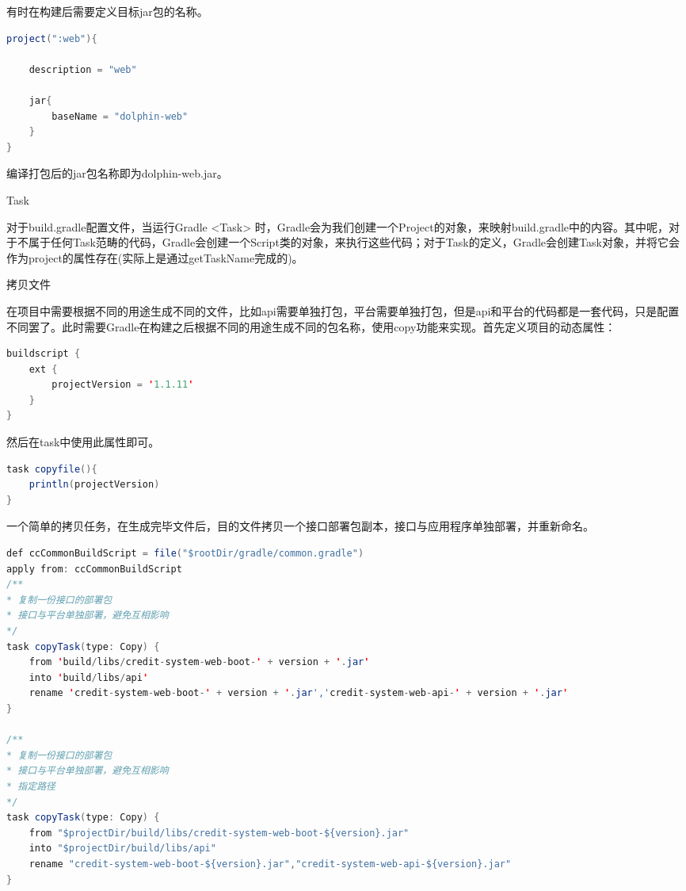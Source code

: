 \documentclass[12pt]{book}
\makeatletter
\numberwithin{dummy}{section}
\theoremstyle{ocrenumbox}
\theoremstyle{blacknumex}
\theoremstyle{blacknumbox}
\theoremstyle{ocrenum}
\renewcommand{\subsection}{\@startsection {subsection}{2}{\z@}
	{-3ex \@plus -0.1ex \@minus -.4ex}
	{0.5ex \@plus.2ex }
	{\normalfont\sffamily\bfseries}}
\renewcommand\paragraph{\@startsection{paragraph}{4}{\z@}
	{-2ex \@plus-.2ex \@minus .2ex}
	{.1ex}
	{\normalfont\small\sffamily\bfseries}}
\makeatother
\begin{document}
有时在构建后需要定义目标jar包的名称。

\begin{lstlisting}[language=Java]
project(":web"){

	description = "web"
	
	jar{
		baseName = "dolphin-web"
	}
}
\end{lstlisting}

编译打包后的jar包名称即为dolphin-web.jar。

\subsection{Task}

对于build.gradle配置文件，当运行Gradle <Task> 时，Gradle会为我们创建一个Project的对象，来映射build.gradle中的内容。其中呢，对于不属于任何Task范畴的代码，Gradle会创建一个Script类的对象，来执行这些代码；对于Task的定义，Gradle会创建Task对象，并将它会作为project的属性存在(实际上是通过getTaskName完成的)。


\paragraph{拷贝文件}

在项目中需要根据不同的用途生成不同的文件，比如api需要单独打包，平台需要单独打包，但是api和平台的代码都是一套代码，只是配置不同罢了。此时需要Gradle在构建之后根据不同的用途生成不同的包名称，使用copy功能来实现。首先定义项目的动态属性：

\begin{lstlisting}[language=Java]
buildscript {
	ext {
		projectVersion = '1.1.11'
	}
}
\end{lstlisting}

然后在task中使用此属性即可。

\begin{lstlisting}[language=Java]
task copyfile(){
	println(projectVersion)
}
\end{lstlisting}

一个简单的拷贝任务，在生成完毕文件后，目的文件拷贝一个接口部署包副本，接口与应用程序单独部署，并重新命名。

\begin{lstlisting}[language=Java]
def ccCommonBuildScript = file("$rootDir/gradle/common.gradle")
apply from: ccCommonBuildScript
/**
* 复制一份接口的部署包
* 接口与平台单独部署，避免互相影响
*/
task copyTask(type: Copy) {
	from 'build/libs/credit-system-web-boot-' + version + '.jar'
	into 'build/libs/api'
	rename 'credit-system-web-boot-' + version + '.jar','credit-system-web-api-' + version + '.jar'
}

/**
* 复制一份接口的部署包
* 接口与平台单独部署，避免互相影响
* 指定路径
*/
task copyTask(type: Copy) {
	from "$projectDir/build/libs/credit-system-web-boot-${version}.jar"
	into "$projectDir/build/libs/api"
	rename "credit-system-web-boot-${version}.jar","credit-system-web-api-${version}.jar"
}
\end{lstlisting}
\end{document}
